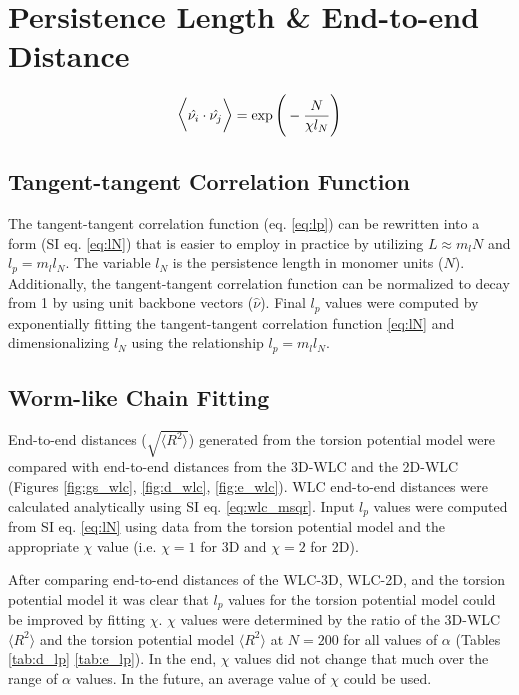 \section{Persistence Length \& End-to-end Distance}
\label{sec:lp}
\begin{equation}
\Large
\Big \langle \large \hat{\nu_i} \cdot \hat{\nu_j} \Big \rangle = \exp{\bigg(-\frac{N}{\chi l_{N}}\bigg)}
\label{eq:lN}
\end{equation}

\subsection{Tangent-tangent Correlation Function}

The tangent-tangent correlation function (eq. \ref{eq:lp}) can be rewritten into a form (SI eq. \ref{eq:lN}) that is easier to employ in practice by utilizing $L \approx m_lN$ and $l_p = m_ll_N$. The variable $l_N$ is the persistence length in monomer units ($N$). Additionally, the tangent-tangent correlation function can be normalized to decay from 1 by using unit backbone vectors ($\hat{\nu}$). Final $l_p$ values were computed by exponentially fitting the tangent-tangent correlation function \ref{eq:lN} and dimensionalizing $l_N$ using the relationship $l_p = m_ll_N$.

\subsection{Worm-like Chain Fitting}

End-to-end distances ($\sqrt{\big \langle R^2 \big \rangle}$) generated from the torsion potential model were compared with end-to-end distances from the 3D-WLC and the 2D-WLC (Figures \ref{fig:gs_wlc}, \ref{fig:d_wlc}, \ref{fig:e_wlc}). WLC end-to-end distances were calculated analytically using SI eq. \ref{eq:wlc_msqr}. Input $l_p$ values were computed from SI eq. \ref{eq:lN} using data from the torsion potential model and the appropriate $\chi$ value (i.e. $\chi = 1$ for 3D and $\chi = 2$ for 2D).

After comparing end-to-end distances of the WLC-3D, WLC-2D, and the torsion potential model it was clear that $l_p$ values for the torsion potential model could be improved by fitting $\chi$. $\chi$ values were determined by the ratio of the 3D-WLC $\big \langle R^2 \big \rangle$ and the torsion potential model $\big \langle R^2 \big \rangle$ at $N = 200$ for all values of $\alpha$ (Tables \ref{tab:d_lp} \ref{tab:e_lp}). In the end, $\chi$ values did not change that much over the range of $\alpha$ values. In the future, an average value of $\chi$ could be used.

